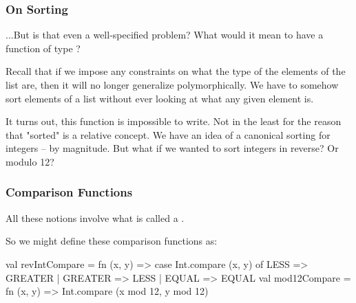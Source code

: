 \documentclass[aspectratio=169]{beamer}
\begin{document}
\begin{frame}[fragile]
  \frametitle{On Sorting}

  ...But is that even a well-specified problem? What would it mean to have a function of
  type ?

  \pause
  \vspace{\fill}

  Recall that if we impose any constraints on what the type of the elements of the list are,
  then it will no longer generalize polymorphically. We have to somehow sort elements of a
  list without ever looking at what any given element is.

  \pause
  \vspace{\fill}

  It turns out, this function is impossible to write. Not in the least for the reason that
  "sorted" is a relative concept. We have an idea of a canonical sorting for integers --
  by magnitude. But what if we wanted to sort integers in reverse? Or modulo 12?
\end{frame}

\begin{frame}[fragile]
  \frametitle{Comparison Functions}

  All these notions involve what is called a .

  \pause
  \vspace{\fill}


  \pause
  \vspace{\fill}


  \pause
  \vspace{\fill}

  So we might define these comparison functions as:

  \begin{codeblock}
    val revIntCompare =
      fn (x, y) => case Int.compare (x, y) of
                     LESS => GREATER
                   | GREATER => LESS
                   | EQUAL => EQUAL
    val mod12Compare =
      fn (x, y) => Int.compare (x mod 12, y mod 12)
  \end{codeblock}
\end{frame}
\end{document}

